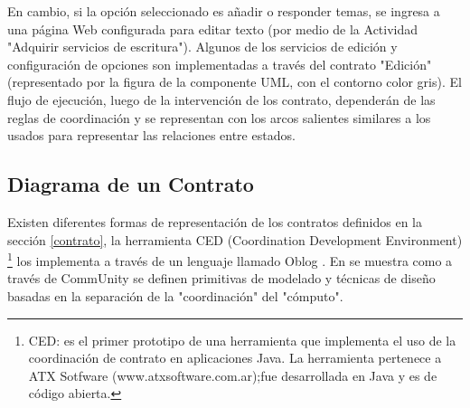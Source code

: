 En cambio, si la opción seleccionado es añadir o responder temas, se ingresa a
una página Web configurada para editar texto (por medio de la Actividad
"Adquirir servicios de escritura"). Algunos de los servicios de edición y
configuración de opciones son implementadas a través del contrato "Edición"
(representado por la figura de la componente UML, con el contorno color gris).
El flujo de ejecución, luego de la intervención de los contrato, dependerán de
las reglas de coordinación y se representan con los arcos salientes similares a
los usados para representar las relaciones entre estados.


\subsection{Diagrama de un Contrato}

Existen diferentes formas de representación de los contratos definidos en la
sección \ref{contrato}, la herramienta  CED (Coordination Development
Environment) \footnote{CED: es el primer prototipo de una herramienta que
implementa el uso de la coordinación de contrato en aplicaciones Java. La
herramienta pertenece a ATX Sotfware (www.atxsoftware.com.ar);fue desarrollada
en Java y es de código abierta.} los implementa a través de un lenguaje llamado
Oblog \cite{lenguajeoblog}. En \cite{communit} se muestra como a través de
CommUnity se definen primitivas de modelado y técnicas de diseño basadas en la
separación de la "coordinación" del "cómputo". 

